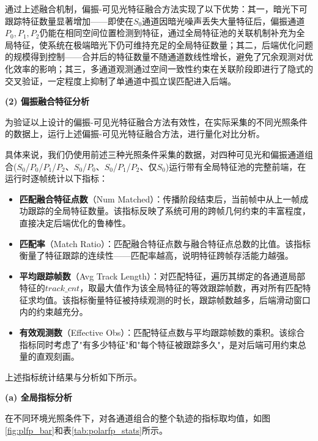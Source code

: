 通过上述融合机制，偏振-可见光特征融合方法实现了以下优势：其一，暗光下可跟踪特征数量显著增加——即使在$S_0$通道因暗光噪声丢失大量特征后，偏振通道$P_0, P_1, P_2$仍能在相同空间位置检测到特征，通过全局特征池的关联机制补充为全局特征，使系统在极端暗光下仍可维持充足的全局特征数量；其二，后端优化问题的规模得到控制——合并后的特征数量不随通道数线性增长，避免了冗余观测对优化效率的影响；其三，多通道观测通过空间一致性约束在关联阶段即进行了隐式的交叉验证，一定程度上抑制了单通道中孤立误匹配进入后端。


\textbf{(2) 偏振融合特征分析}

为验证以上设计的偏振-可见光特征融合方法有效性，在实际采集的不同光照条件的数据上，运行上述偏振-可见光特征融合方法，进行量化对比分析。

具体来说，我们仍使用前述三种光照条件采集的数据，对四种可见光和偏振通道组合($S_0$/$P_0$/$P_1$/$P_2$、$S_0$/$P_0$、$S_0$/$P_1$/$P_2$、仅$S_0$)运行带有全局特征池的完整前端，在运行时逐帧统计以下指标：

\begin{itemize}
    \item \textbf{匹配融合特征点数}（Num Matched）：传播阶段结束后，当前帧中从上一帧成功跟踪的全局特征数量。该指标反映了系统可用的跨帧几何约束的丰富程度，直接决定后端优化的鲁棒性。
    \item \textbf{匹配率}（Match Ratio）：匹配融合特征点数与融合特征点总数的比值。该指标衡量了特征跟踪的连续性——匹配率越高，说明特征跨帧存活能力越强。
    \item \textbf{平均跟踪帧数}（Avg Track Length）：对匹配特征，遍历其绑定的各通道局部特征的$track\_cnt$，取最大值作为该全局特征的等效跟踪帧数，再对所有匹配特征求均值。该指标衡量特征被持续观测的时长，跟踪帧数越多，后端滑动窗口内的约束越充分。
    \item \textbf{有效观测数}（Effective Obs）：匹配特征点数与平均跟踪帧数的乘积。该综合指标同时考虑了"有多少特征"和"每个特征被跟踪多久"，是对后端可用约束总量的直观刻画。
\end{itemize}

上述指标统计结果与分析如下所示。

\textbf{(a) 全局指标分析}

在不同环境光照条件下，对各通道组合的整个轨迹的指标取均值，如图\ref{fig:plfp_bar}和表\ref{tab:polarfp_stats}所示。

